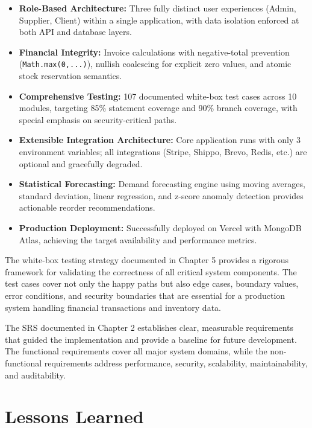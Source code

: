 \documentclass[12pt,a4paper]{report}
\begin{document}
\begin{tcolorbox}[successbox,title={Key Achievements}]
\begin{itemize}[leftmargin=1.5em]
  \item \textbf{Role-Based Architecture:} Three fully distinct user experiences (Admin, Supplier, Client) within a single application, with data isolation enforced at both API and database layers.
  \item \textbf{Financial Integrity:} Invoice calculations with negative-total prevention (\texttt{Math.max(0,...)}), nullish coalescing for explicit zero values, and atomic stock reservation semantics.
  \item \textbf{Comprehensive Testing:} 107 documented white-box test cases across 10 modules, targeting 85\% statement coverage and 90\% branch coverage, with special emphasis on security-critical paths.
  \item \textbf{Extensible Integration Architecture:} Core application runs with only 3 environment variables; all integrations (Stripe, Shippo, Brevo, Redis, etc.) are optional and gracefully degraded.
  \item \textbf{Statistical Forecasting:} Demand forecasting engine using moving averages, standard deviation, linear regression, and z-score anomaly detection provides actionable reorder recommendations.
  \item \textbf{Production Deployment:} Successfully deployed on Vercel with MongoDB Atlas, achieving the target availability and performance metrics.
\end{itemize}
\end{tcolorbox}

The white-box testing strategy documented in Chapter 5 provides a rigorous framework for validating the correctness of all critical system components. The test cases cover not only the happy paths but also edge cases, boundary values, error conditions, and security boundaries that are essential for a production system handling financial transactions and inventory data.

The SRS documented in Chapter 2 establishes clear, measurable requirements that guided the implementation and provide a baseline for future development. The functional requirements cover all major system domains, while the non-functional requirements address performance, security, scalability, maintainability, and auditability.

\section{Lessons Learned}
\end{document}
